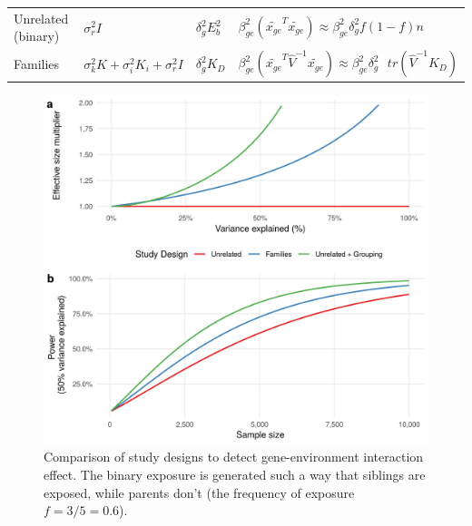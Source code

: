 \documentclass[]{book}
\begin{document}
\begin{longtable}[]{@{}llll@{}}
\begin{minipage}[t]{0.15\columnwidth}
Unrelated (binary)\strut
\end{minipage} & \begin{minipage}[t]{0.16\columnwidth}\raggedright\strut
\(\sigma_r^2 I\)\strut
\end{minipage} & \begin{minipage}[t]{0.17\columnwidth}\raggedright\strut
\(\delta_g^2 E_b^2\)\strut
\end{minipage} & \begin{minipage}[t]{0.40\columnwidth}\raggedright\strut
\(\beta^2_{ge} (\tilde{x_{ge}}^T \tilde{x_{ge}}) \approx \beta^2_{ge} \delta_g^2 f (1 -f) n\)\strut
\end{minipage}\tabularnewline
\begin{minipage}[t]{0.15\columnwidth}\raggedright\strut
Families\strut
\end{minipage} & \begin{minipage}[t]{0.16\columnwidth}\raggedright\strut
\(\sigma_k^2 K + \sigma_i^2 K_i + \sigma_r^2 I\)\strut
\end{minipage} & \begin{minipage}[t]{0.17\columnwidth}\raggedright\strut
\(\delta_g^2 K_D\)\strut
\end{minipage} & \begin{minipage}[t]{0.40\columnwidth}\raggedright\strut
\(\beta^2_{ge} (\tilde{x_{ge}}^T \hat{V}^{-1} \tilde{x_{ge}}) \approx \beta^2_{ge} \delta_g^2 \mbox { } tr(\hat{V}^{-1} K_D)\)\strut
\end{minipage}\tabularnewline
\bottomrule
\end{longtable}

\begin{figure}

{\centering \includegraphics[width=0.75\linewidth]{figures/09-figure-power-interaction-expsib-two-panels} 

}

\caption{Comparison of study designs to detect
gene-environment interaction effect. The binary exposure is generated
such a way that siblings are exposed, while parents don't (the frequency
of exposure \(f = 3/5 = 0.6\)).}\label{fig:power-interaction}
\end{figure}
\end{document}
